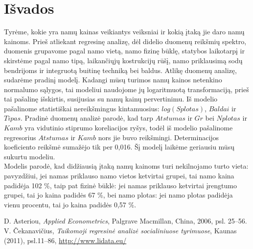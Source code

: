 \documentclass[a4paper]{article}
\begin{document}
\section{Išvados}
\hspace*{0,52cm}Tyrėme, kokie yra namų kainas veikiantys veiksniai ir kokią įtaką jie daro namų kainoms. Prieš atliekant regresinę analizę, dėl didelio duomenų reikšmių spektro, duomenis grupavome pagal namo vietą, namo fizinę būklę, statybos laikotarpį ir skirstėme pagal namo tipą, laikančiųjų kostrukcijų rūšį, namo priklausimą sodų bendrijoms ir integruotą buitinę techniką bei baldus. Atlikę duomenų analizę, sudarėme pradinį modelį.  Kadangi mūsų turimos namų kainos netenkino normalumo sąlygos, tai modeliui naudojome jų logaritmuotą transformaciją, prieš tai pašalinę išskirtis, susijusias su namų kainų pervertinimu. Iš modelio pašalinome statistiškai nereikšmingus kintamuosius: $log(Splotas)$, $Baldai$ ir $Tipas$. Pradinė duomenų analizė parodė, kad tarp $Atstumas$ ir $Gr$ bei $Nplotas$ ir $Kamb$ yra vidutinio stiprumo koreliacijos ryšys, todėl iš modelio pašalinome regresorius $Atstumas$ ir $Kamb$  nors jie buvo reikšmingi. Determinacijos koeficiento reikšmė sumažėjo tik per 0,016. Šį modelį laikėme geriausiu mūsų sukurtu modeliu.\\
\hspace*{0,52cm}Modelis parodė, kad didžiausią įtaką namų kainoms turi nekilnojamo turto vieta: pavyzdžiui, jei namas priklauso namo vietos ketvirtai grupei, tai namo kaina padidėja 102 \%, taip pat fizinė būklė: jei namas priklauso ketvirtai įrengtumo grupei, tai jo kaina padidės 67 \%, bei namo plotas: jei namo plotas padidėja vienu procentu, tai jo kaina padidės 0,57 \%.\\



\newpage
\renewcommand{\refname}{\section{Literatūra}}
\begin{thebibliography}{3}
 D. Asteriou, \emph{Applied Econometrics}, Palgrave Macmillan, China, 2006, psl. 25--56.
 V. Čekanavičius, \emph{Taikomoji regresinė analizė socialiniuose tyrimuose}, Kaunas  (2011), psl.11--86, \url{http://www.lidata.eu/}
\end{thebibliography}
\end{document}
